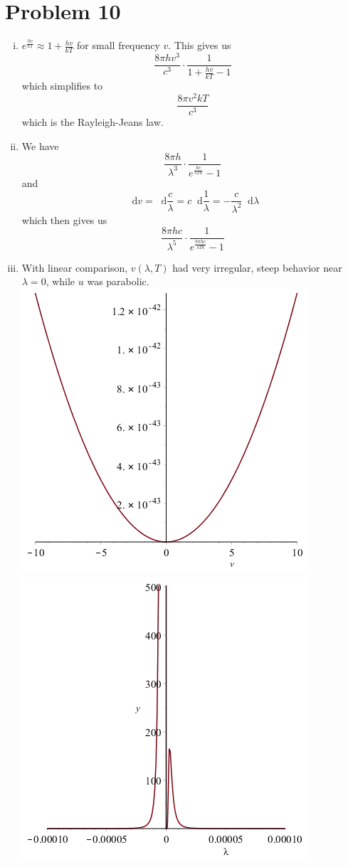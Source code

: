 \documentclass[11pt]{article} %
\newcommand*\diff{\mathop{}\!\mathrm{d}}
\begin{document}
\section*{Problem 10}
\begin{enumerate}[i.)]
\item $e^{\frac{hv}{kT}} \approx 1+\frac{hv}{kT}$ for small frequency $v$. This gives us 
	$$\frac{8\pi hv^3}{c^3} \cdot \frac{1}{1+\frac{hv}{kT} -1}$$
which simplifies to
	$$\frac{8\pi v^2kT}{c^3}$$
which is the Rayleigh-Jeans law.
\\
\par

\item We have 
	$$\frac{8\pi h}{\lambda^3}\cdot\frac{1}{e^\frac{hc}{\lambda Tk} - 1}$$ 
and 
	$$\diff v = \diff \frac{c}{\lambda} = c \diff\frac{1}{\lambda} = -\frac{c}{\lambda^2} \diff \lambda$$
which then gives us
	$$\frac{8 \pi hc}{\lambda^5}\cdot\frac{1}{e^{\frac{8 \pi hc}{\lambda Tk}} -1}$$
\item With linear comparison, $v(\lambda,T)$ had very irregular, steep behavior near $\lambda = 0$, while $u$ was parabolic. \\
\includegraphics[scale=.5]{plots/problem10plot1000a.png}
\includegraphics[scale=.5]{plots/problem10plot1000b.png} \\

\end{enumerate}
\end{document}
